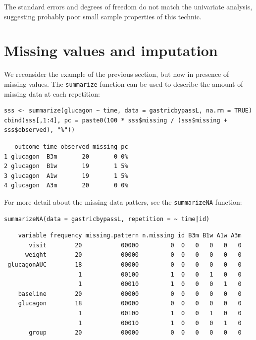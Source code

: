 \documentclass[12pt]{article}
\begin{document}
The standard errors and degrees of freedom do not match the univariate
analysis, suggesting probably poor small sample properties of this
technic.

\clearpage

\section{Missing values and imputation}
\label{sec:org55d6eaa}

We reconsider the example of the previous section, but now in presence
of missing values. The \texttt{summarize} function can be used to describe
the amount of missing data at each repetition:
\lstset{language=r,label= ,caption= ,captionpos=b,numbers=none}
\begin{lstlisting}
sss <- summarize(glucagon ~ time, data = gastricbypassL, na.rm = TRUE)
cbind(sss[,1:4], pc = paste0(100 * sss$missing / (sss$missing + sss$observed), "%"))
\end{lstlisting}

\begin{verbatim}
   outcome time observed missing pc
1 glucagon  B3m       20       0 0%
2 glucagon  B1w       19       1 5%
3 glucagon  A1w       19       1 5%
4 glucagon  A3m       20       0 0%
\end{verbatim}


For more detail about the missing data patters, see the \texttt{summarizeNA}
function:
\lstset{language=r,label= ,caption= ,captionpos=b,numbers=none}
\begin{lstlisting}
summarizeNA(data = gastricbypassL, repetition = ~ time|id)
\end{lstlisting}

\begin{verbatim}
    variable frequency missing.pattern n.missing id B3m B1w A1w A3m
       visit        20           00000         0  0   0   0   0   0
      weight        20           00000         0  0   0   0   0   0
 glucagonAUC        18           00000         0  0   0   0   0   0
                     1           00100         1  0   0   1   0   0
                     1           00010         1  0   0   0   1   0
    baseline        20           00000         0  0   0   0   0   0
    glucagon        18           00000         0  0   0   0   0   0
                     1           00100         1  0   0   1   0   0
                     1           00010         1  0   0   0   1   0
       group        20           00000         0  0   0   0   0   0
\end{verbatim}
\end{document}

